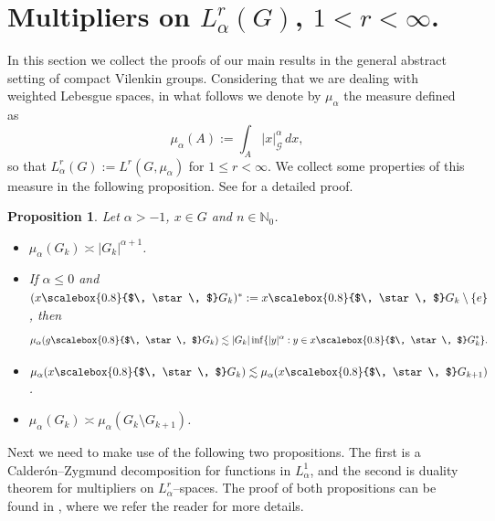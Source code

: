 \documentclass[12pt, reqno]{amsart}
\newtheorem{pro}[defi]{Proposition}
\newcommand{\1}{\mathds{1}}
\newcommand{\smallstar}{\scalebox{0.8}{$\, \star \, $}}
\begin{document}
\section{Multipliers on $L^r_\alpha (G)$, $1 <r< \infty$.}

In this section we collect the proofs of our main results in the general abstract setting of compact Vilenkin groups. Considering that we are dealing with weighted Lebesgue spaces, in what follows we denote
by $\mu_{\alpha}$ the measure defined as
\[
\mu_{\alpha}(A):=\int_{A}|x|_{\mathcal{G}}^{\alpha}\,dx,
\]
so that $L^{r}_{\alpha}(G):=L^{r}(G,\mu_{\alpha})$ for $1\leq r<\infty$. We collect some properties of this
measure in the following proposition. See \cite{Onneweer1985} for a detailed proof.

\begin{pro}\label{promeasurewighted}
    Let $\alpha>-1$, $x\in G$ and $n\in\mathbb{N}_{0}$.
\begin{itemize}
    \item[(i)] $\mu_{\alpha}(G_{k})\asymp |G_{k}|^{\alpha+1}$.
    \item[(ii)] If $\alpha\leq 0$ and $(x \smallstar G_{k})^{*}:=x \smallstar G_{k}\setminus\{e\}$, then
    \[
    \mu_{\alpha}(g \smallstar G_{k})\lesssim |G_{k}|\inf\{|y|^{\alpha}:y\in x\smallstar G^{*}_{k}\}.
    \]
    \item[(iii)] $\mu_{\alpha}(x \smallstar G_{k})\lesssim \mu_{\alpha}(x \smallstar G_{k+1})$.
    \item[(iv)] $\mu_{\alpha}(G_{k})\asymp \mu_{\alpha}(G_{k}\setminus G_{k+1})$.
\end{itemize}
\end{pro}

Next we need to make use of the following two propositions. The first is a Calderón–Zygmund
decomposition for functions in $L^{1}_{\alpha}$, and the second is duality theorem for multipliers on
$L^{r}_{\alpha}$–spaces. The proof of both propositions can be found in \cite{Onneweer1985}, where we refer the reader
for more details.
\end{document}
